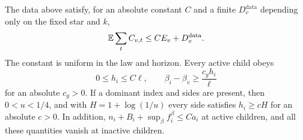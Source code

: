\begin{lemma}\label{lem:parameter-gaps}
The data above satisfy, for an absolute constant $C$ and a finite
$D_v^{\mathrm{data}}$ depending only on the fixed star and $k$,
\begin{equation}\label{eq:coarse-data-budget}
             \mathbb E\sum_t C_{v,t}\le C E_v+D_v^{\mathrm{data}}.
\end{equation}
The constant is uniform in the law and horizon.  Every active child obeys
\begin{equation}\label{eq:parameter-gap}
        0\le h_i\le C\ell,\qquad
        \beta_i-\beta_v\ge\frac{c_g h_i}{\ell}
\end{equation}
for an absolute $c_g>0$.  If a dominant index and sides are present,
then $0<u<1/4$, and with $H=1+\log(1/u)$ every side satisfies
$h_i\ge cH$ for an absolute $c>0$.
In addition, $n_i+B_i+\sup_\beta f_i^\beta\le C a_i$ at active
children, and all these quantities vanish at inactive children.
\end{lemma}

